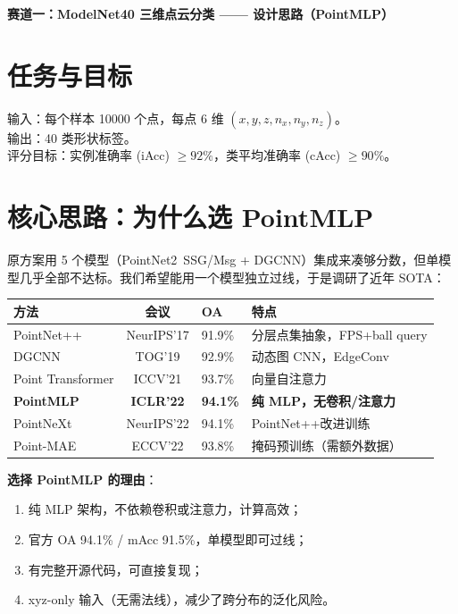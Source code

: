 \documentclass[10pt,a4paper]{ctexart}
\begin{document}
\begin{center}\large\bfseries 赛道一：ModelNet40 三维点云分类 —— 设计思路（PointMLP）\end{center}
\vspace{-0.6em}

\section{任务与目标}
输入：每个样本 10000 个点，每点 6 维 $(x,y,z,n_x,n_y,n_z)$。\\
输出：40 类形状标签。\\
评分目标：实例准确率 (iAcc) $\geq 92\%$，类平均准确率 (cAcc) $\geq 90\%$。

\section{核心思路：为什么选 PointMLP}

原方案用 5 个模型（PointNet2~SSG/Msg + DGCNN）集成来凑够分数，但单模型几乎全部不达标。我们希望能用一个模型独立过线，于是调研了近年 SOTA：

\begin{center}\small
\begin{tabular}{lcll}
\toprule
方法 & 会议 & OA & 特点 \\
\midrule
PointNet++ & NeurIPS'17 & 91.9\% & 分层点集抽象，FPS+ball query \\
DGCNN & TOG'19 & 92.9\% & 动态图 CNN，EdgeConv  \\
Point Transformer & ICCV'21 & 93.7\% & 向量自注意力 \\
\textbf{PointMLP} & \textbf{ICLR'22} & \textbf{94.1\%} & \textbf{纯 MLP，无卷积/注意力} \\
PointNeXt & NeurIPS'22 & 94.1\% & PointNet++改进训练 \\
Point-MAE & ECCV'22 & 93.8\% & 掩码预训练（需额外数据） \\
\bottomrule
\end{tabular}
\end{center}

\textbf{选择 PointMLP 的理由}：
\begin{enumerate}
\item 纯 MLP 架构，不依赖卷积或注意力，计算高效；
\item 官方 OA 94.1\% / mAcc 91.5\%，单模型即可过线；
\item 有完整开源代码，可直接复现；
\item xyz-only 输入（无需法线），减少了跨分布的泛化风险。
\end{enumerate}
\end{document}
